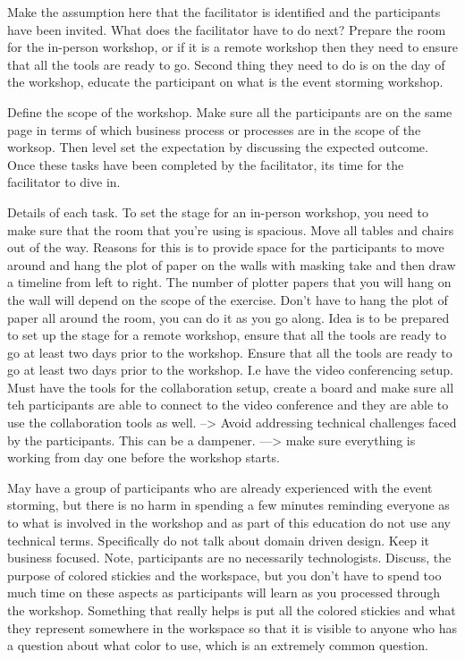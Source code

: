 \documentclass[a4paper, 11pt]{book}
\begin{document}
    Make the assumption here that the facilitator is identified and the participants have been invited.
    What does the facilitator have to do next?
    Prepare the room for the in-person workshop, or if it is a remote workshop then they need to ensure that all the tools are ready to go.
    Second thing they need to do is on the day of the workshop, educate the participant on what is the event storming workshop.

    Define the scope of the workshop. Make sure all the participants are on the same page in terms of which business process or processes are in the scope of the worksop.
    Then level set the expectation by discussing the expected outcome.
    Once these tasks have been completed by the facilitator, its time for the facilitator to dive in.

    Details of each task.
    To set the stage for an in-person workshop, you need to make sure that the room that you're using is spacious.
    Move all tables and chairs out of the way.
    Reasons for this is to provide space for the participants to move around and hang the plot of paper on the walls with masking take and then draw a timeline from left to right.
    The number of plotter papers that you will hang on the wall will depend on the scope of the exercise.
    Don't have to hang the plot of paper all around the room, you can do it as you go along.
    Idea is to be prepared to set up the stage for a remote workshop, ensure that all the tools are ready to go at least two days prior to the workshop.
    Ensure that all the tools are ready to go at least two days prior to the workshop.
    I.e have the video conferencing setup.
    Must have the tools for the collaboration setup, create a board and make sure all teh participants are able to connect to the video conference and they are able to use the collaboration tools as well.
    --> Avoid addressing technical challenges faced by the participants. This can be a dampener.
    ---> make sure everything is working from day one before the workshop starts.

    May have a group of participants who are already experienced with the event storming, but there is no harm in spending a few minutes reminding everyone as to what is involved in the workshop and as part of this education do not use any technical terms.
    Specifically do not talk about domain driven design.
    Keep it business focused.
    Note, participants are no necessarily technologists.
    Discuss, the purpose of colored stickies and the workspace, but you don't have to spend too much time on these aspects as participants will learn as you processed through the workshop.
    Something that really helps is put all the colored stickies and what they represent somewhere in the workspace so that it is visible to anyone who has a question about what color to use, which is an extremely common question.
\end{document}
